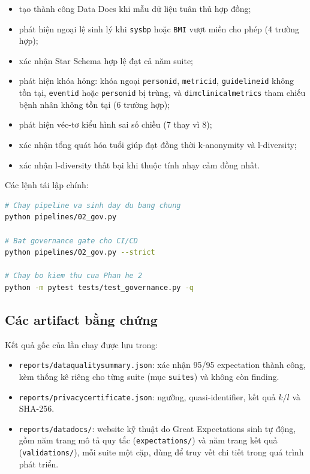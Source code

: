 \documentclass[11pt,a4paper]{article}
\renewcommand{\_}{\texorpdfstring{\origunderscore\allowbreak}{\origunderscore}}
\begin{document}
\begin{itemize}
    \item tạo thành công Data Docs khi mẫu dữ liệu tuân thủ hợp đồng;
    \item phát hiện ngoại lệ sinh lý khi \texttt{sys\_bp} hoặc \texttt{BMI} vượt miền cho phép (4 trường hợp);
    \item xác nhận Star Schema hợp lệ đạt cả năm suite;
    \item phát hiện khóa hỏng: khóa ngoại \texttt{person\_id}, \texttt{metric\_id}, \texttt{guideline\_id} không tồn tại, \texttt{event\_id} hoặc \texttt{person\_id} bị trùng, và \texttt{dim\_clinical\_metrics} tham chiếu bệnh nhân không tồn tại (6 trường hợp);
    \item phát hiện véc-tơ kiểu hình sai số chiều (7 thay vì 8);
    \item xác nhận tổng quát hóa tuổi giúp đạt đồng thời k-anonymity và l-diversity;
    \item xác nhận l-diversity thất bại khi thuộc tính nhạy cảm đồng nhất.
\end{itemize}

Các lệnh tái lập chính:

\begin{lstlisting}[language=bash]
# Chay pipeline va sinh day du bang chung
python pipelines/02_gov.py

# Bat governance gate cho CI/CD
python pipelines/02_gov.py --strict

# Chay bo kiem thu cua Phan he 2
python -m pytest tests/test_governance.py -q
\end{lstlisting}

\subsection{Các artifact bằng chứng}

Kết quả gốc của lần chạy được lưu trong:

\begin{itemize}
    \item \texttt{reports/data\_quality\_summary.json}: xác nhận 95/95 expectation thành công, kèm thống kê riêng cho từng suite (mục \texttt{suites}) và không còn finding.
    \item \texttt{reports/privacy\_certificate.json}: ngưỡng, quasi-identifier, kết quả $k/l$ và SHA-256.
    \item \texttt{reports/data\_docs/}: website kỹ thuật do Great Expectations sinh tự động, gồm năm trang mô tả quy tắc (\texttt{expectations/}) và năm trang kết quả (\texttt{validations/}), mỗi suite một cặp, dùng để truy vết chi tiết trong quá trình phát triển.
\end{itemize}
\end{document}
